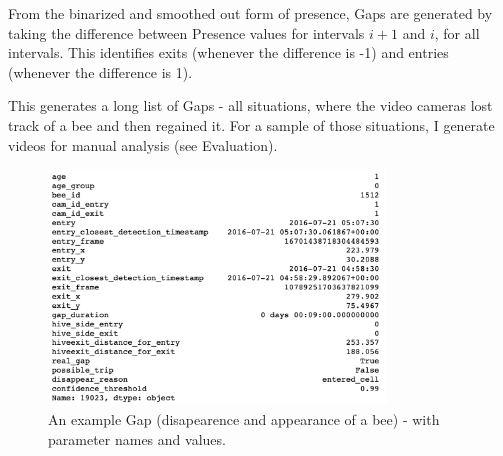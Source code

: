 From the binarized and smoothed out form of presence, Gaps are generated by
taking the difference between Presence values for intervals $i+1$ and $i$, for all
intervals. This identifies exits (whenever the difference is -1) and entries
(whenever the difference is 1). 

This generates a long list of Gaps - all situations, where the video cameras lost track
of a bee and then regained it. For a sample of those situations, I generate videos for manual analysis (see Evaluation).

\begin{figure}[htbp!] 
\centering    
\includegraphics[width=0.8\textwidth]{single-gap}
\caption[single-gap]{An example Gap (disapearence and appearance of a bee) - with parameter names and values.}
\label{fig:single-gap}
\end{figure}








